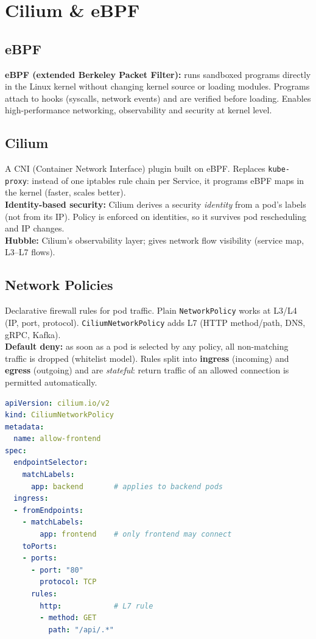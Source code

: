 \renewcommand{\chapcolor}{chCilium}
\section{Cilium \& eBPF}
\subsection{eBPF}
\textbf{eBPF (extended Berkeley Packet Filter):} runs sandboxed programs directly in the Linux kernel without changing kernel source or loading modules. Programs attach to hooks (syscalls, network events) and are verified before loading. Enables high-performance networking, observability and security at kernel level.

\subsection{Cilium}
A CNI (Container Network Interface) plugin built on eBPF. Replaces \texttt{kube-proxy}: instead of one iptables rule chain per Service, it programs eBPF maps in the kernel (faster, scales better). \\
\textbf{Identity-based security:} Cilium derives a security \textit{identity} from a pod's labels (not from its IP). Policy is enforced on identities, so it survives pod rescheduling and IP changes. \\
\textbf{Hubble:} Cilium's observability layer; gives network flow visibility (service map, L3--L7 flows).

\subsection{Network Policies}
Declarative firewall rules for pod traffic. Plain \texttt{NetworkPolicy} works at L3/L4 (IP, port, protocol). \texttt{CiliumNetworkPolicy} adds L7 (HTTP method/path, DNS, gRPC, Kafka). \\
\textbf{Default deny:} as soon as a pod is selected by any policy, all non-matching traffic is dropped (whitelist model). Rules split into \textbf{ingress} (incoming) and \textbf{egress} (outgoing) and are \textit{stateful}: return traffic of an allowed connection is permitted automatically.
\begin{lstlisting}[language=yaml]
apiVersion: cilium.io/v2
kind: CiliumNetworkPolicy
metadata:
  name: allow-frontend
spec:
  endpointSelector:
    matchLabels:
      app: backend       # applies to backend pods
  ingress:
  - fromEndpoints:
    - matchLabels:
        app: frontend    # only frontend may connect
    toPorts:
    - ports:
      - port: "80"
        protocol: TCP
      rules:
        http:            # L7 rule
        - method: GET
          path: "/api/.*"
\end{lstlisting}
